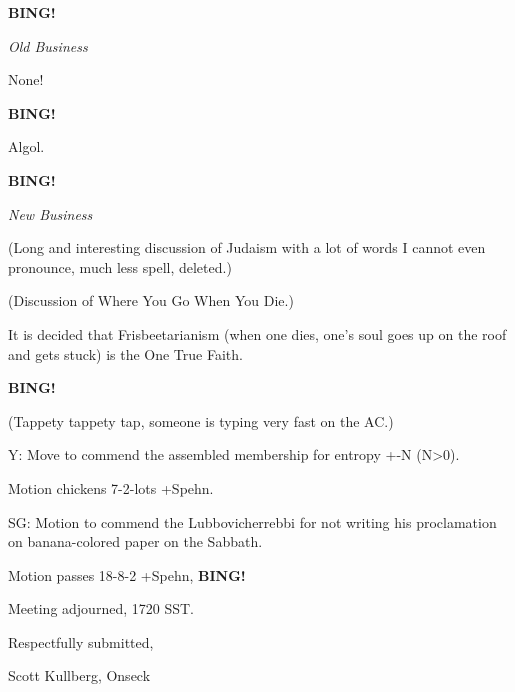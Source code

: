 \documentclass[12pt]{article}
\newcommand{\bing}{{\bf BING!} }
\newcommand{\goto}[1]{\bing \vskip 12pt \centerline{{\em{#1}}}}
\begin{document}
\goto{Old Business}

None!

\bing

Algol.

\goto{New Business}

(Long and interesting discussion of Judaism with a lot of words I cannot even pronounce, much less spell, deleted.)

(Discussion of Where You Go When You Die.)

It is decided that Frisbeetarianism (when one dies, one's soul goes up on the roof and gets stuck) is the One True Faith.

\bing

(Tappety tappety tap, someone is typing very fast on the AC.)

Y: Move to commend the assembled membership for entropy +-N (N>0).

Motion chickens 7-2-lots +Spehn.

SG: Motion to commend the Lubbovicherrebbi for not writing his proclamation on banana-colored paper on the Sabbath.

Motion passes 18-8-2 +Spehn, \bing

\vspace{12pt}

\noindent
Meeting adjourned, 1720 SST.

\vspace{18pt}

\centerline{Respectfully submitted,}
\centerline{Scott Kullberg, Onseck}
\end{document}
